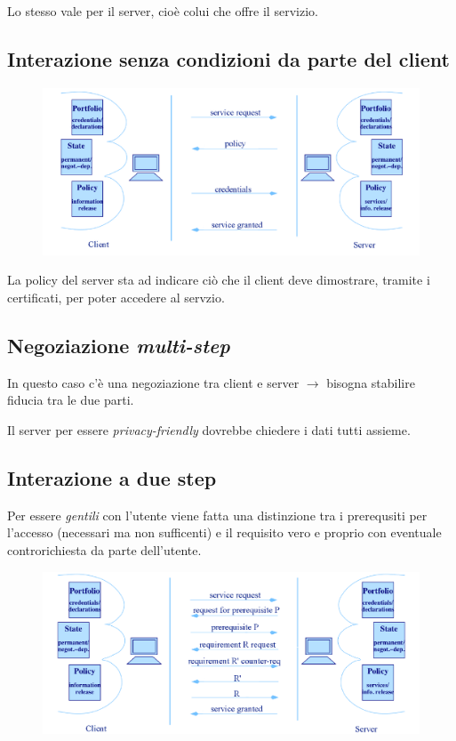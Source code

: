\documentclass{report}
\begin{document}
Lo stesso vale per il server, cioè colui che offre il servizio.

\subsection{Interazione senza condizioni da parte del client}
\begin{figure}[ht]
    \centering
    \includegraphics[width=1\linewidth]{images/interactive access control 1.png}
\end{figure}

\noindent La policy del server sta ad indicare ciò che il client deve dimostrare, tramite i certificati, per poter accedere al servzio.

\subsection{Negoziazione \textit{multi-step}}
\noindent In questo caso c'è una negoziazione tra client e server $ \rightarrow $ bisogna stabilire fiducia tra le due parti.

Il server per essere \textit{privacy-friendly} dovrebbe chiedere i dati tutti assieme.

\newpage
\subsection{Interazione a due step}
Per essere \textit{gentili} con l'utente viene fatta una distinzione tra i prerequsiti per l'accesso (necessari ma non sufficenti) e il requisito vero e proprio
con eventuale controrichiesta da parte dell'utente.

\begin{figure}[ht]
    \centering
    \includegraphics[width=1\linewidth]{images/interactive access control 2.png}
\end{figure}
\end{document}
